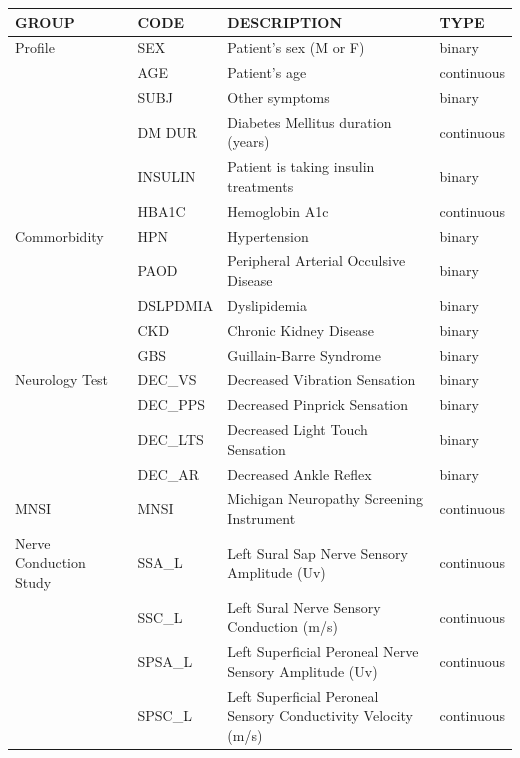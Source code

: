 \documentclass[fleqn,10pt]{wlscirep}
\begin{document}
\begin{table}[h!]
\centering
\footnotesize
\begin{tabular}{llll}
\toprule
GROUP & CODE & DESCRIPTION  & TYPE\\
\midrule
Profile      & SEX & Patient's sex (M or F) & binary \\
             & AGE & Patient's age  & continuous \\
             & SUBJ & Other symptoms  & binary \\
             & DM DUR & Diabetes Mellitus duration (years) & continuous \\
             & INSULIN & Patient is taking insulin treatments & binary \\
             & HBA1C & Hemoglobin A1c & continuous  \\
\midrule
Commorbidity & HPN & Hypertension  & binary \\
             & PAOD & Peripheral Arterial Occulsive Disease  & binary \\
             & DSLPDMIA & Dyslipidemia & binary \\
             & CKD & Chronic Kidney Disease  & binary \\
             & GBS & Guillain-Barre Syndrome  & binary \\
\midrule
Neurology Test   & DEC\_VS & Decreased Vibration Sensation & binary \\
                 & DEC\_PPS & Decreased Pinprick Sensation  & binary \\
                 & DEC\_LTS & Decreased Light Touch Sensation  & binary \\
                 & DEC\_AR & Decreased Ankle Reflex  & binary \\
\midrule
MNSI            & MNSI & Michigan Neuropathy Screening Instrument  & continuous \\
\midrule
Nerve Conduction Study   & SSA\_L & Left Sural Sap Nerve Sensory Amplitude (Uv)  & continuous \\
                         & SSC\_L & Left Sural Nerve Sensory Conduction (m/s)  & continuous \\
                         & SPSA\_L & Left Superficial Peroneal Nerve Sensory Amplitude (Uv)  & continuous \\
                         & SPSC\_L & Left Superficial Peroneal Sensory Conductivity Velocity (m/s)  & continuous \\

\end{tabular}
\end{table}
\end{document}

